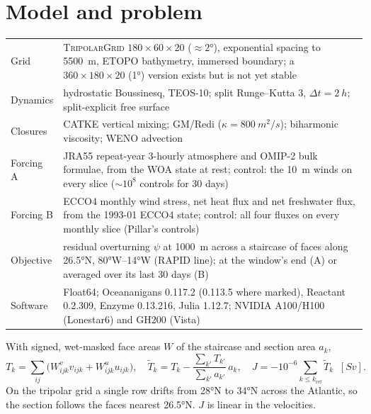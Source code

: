 \documentclass[10pt]{article}
\begin{document}
\section{Model and problem}

\begin{center}\small
\begin{tabular}{@{}lp{}@{}}
\toprule
Grid & \textsc{TripolarGrid} $180\times60\times20$ ($\approx\ang{2}$), exponential spacing to \SI{5500}{m}, ETOPO bathymetry,
       immersed boundary; a $360\times180\times20$ (\ang{1}) version exists but is not yet stable \\
Dynamics & hydrostatic Boussinesq, TEOS-10; split Runge--Kutta 3, $\Delta t = \SI{2}{h}$; split-explicit free surface \\
Closures & CATKE vertical mixing; GM/Redi ($\kappa = \SI{800}{m^2/s}$); biharmonic viscosity; WENO advection \\
Forcing A & JRA55 repeat-year 3-hourly atmosphere and OMIP-2 bulk formulae, from the WOA state at rest; control:
            the \SI{10}{m} winds on every slice ($\sim 10^8$ controls for 30 days) \\
Forcing B & ECCO4 monthly wind stress, net heat flux and net freshwater flux, from the 1993-01 ECCO4 state; control: all
            four fluxes on every monthly slice (Pillar's controls) \\
Objective & residual overturning $\psi$ at \SI{1000}{m} across a staircase of faces along \ang{26.5}N, \ang{80}W--\ang{14}W
            (RAPID line); at the window's end (A) or averaged over its last 30 days (B) \\
Software & Float64; Oceananigans 0.117.2 (0.113.5 where marked), Reactant 0.2.309, Enzyme 0.13.216, Julia 1.12.7;
           NVIDIA A100/H100 (Lonestar6) and GH200 (Vista) \\
\bottomrule
\end{tabular}
\end{center}

With signed, wet-masked face areas $W$ of the staircase and section area $a_k$,
\begin{equation*}
T_k = \sum_{ij} \big(W^{v}_{ijk} v_{ijk} + W^{u}_{ijk} u_{ijk}\big), \quad
\tilde T_k = T_k - \frac{\sum_{k'} T_{k'}}{\sum_{k'} a_{k'}}\, a_k, \quad
J = -10^{-6} \sum_{k \le k_{\text{ref}}} \tilde T_k \;\;[\si{Sv}].
\end{equation*}
On the tripolar grid a single row drifts from \ang{28}N to \ang{34}N across the Atlantic, so the section follows
the faces nearest \ang{26.5}N. $J$ is linear in the velocities.
\end{document}
